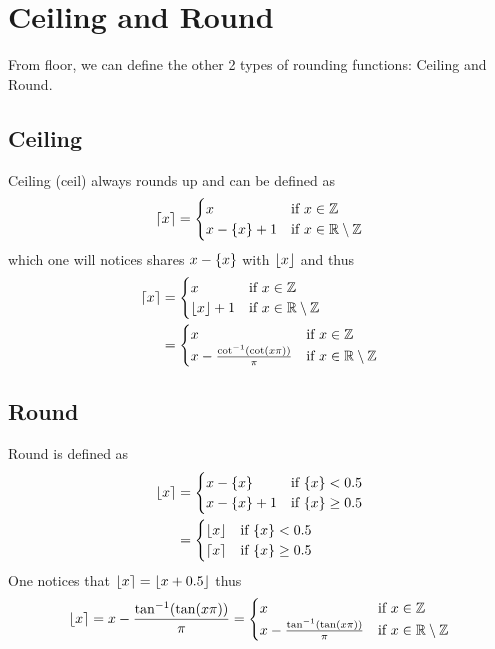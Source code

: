 \documentclass[11pt]{article}
\DeclarePairedDelimiter\ceil{\lceil}{\rceil}
\DeclarePairedDelimiter\floor{\lfloor}{\rfloor}
\DeclarePairedDelimiter\round{\lfloor}{\rceil}
\DeclarePairedDelimiter\fractional{\{}{\}}
\newcommand{\fractionalAlg}{\frac{\cot^{\mathrm{-1}}(\cot(x\pi))}{\pi}}
\begin{document}
\section{Ceiling and Round}
From floor, we can define the other 2 types of rounding functions: Ceiling and Round.
\subsection{Ceiling}
Ceiling (ceil) always rounds up and can be defined as
\begin{gather*}
\ceil*{x}=\begin{cases}
x & \text{if } x \in \mathbb{Z}\\
x-\fractional*{x}+1 & \text{if } x \in \mathbb{R}\setminus\mathbb{Z}
\end{cases}
\end{gather*}
which one will notices shares \(x-\fractional*{x}\) with \(\floor*{x}\) and thus
\begin{equation*}
\begin{split}
\ceil*{x}&=\begin{cases}
x & \text{if } x \in \mathbb{Z}\\
\floor*{x}+1 & \text{if } x \in \mathbb{R}\setminus\mathbb{Z}
\end{cases}\\
&=\begin{cases}
x & \text{if } x \in \mathbb{Z}\\
x-\fractionalAlg & \text{if } x \in \mathbb{R}\setminus\mathbb{Z}\\
\end{cases}
\end{split}
\end{equation*}
\subsection{Round}
Round is defined as
\begin{equation*}
\begin{split}
\round*{x}&=\begin{cases}
x - \fractional*{x} & \text{if } \fractional*{x} < 0.5\\
x-\fractional*{x}+1 & \text{if } \fractional*{x} \geq 0.5
\end{cases}\\
&=\begin{cases}
\floor*{x} & \text{if } \fractional*{x} < 0.5\\
\ceil*{x} & \text{if } \fractional*{x} \geq 0.5
\end{cases}
\end{split}
\end{equation*}
One notices that \(\round*{x}=\floor*{x+0.5}\) thus
\begin{equation*}
\round*{x}=x-\frac{\tan^{\mathrm{-1}}(\tan(x\pi))}{\pi}=\begin{cases}
x & \text{if } x \in \mathbb{Z}\\
x-\frac{\tan^{\mathrm{-1}}(\tan(x\pi))}{\pi} & \text{if } x \in \mathbb{R}\setminus\mathbb{Z}\\
\end{cases}
\end{equation*}
\end{document}
